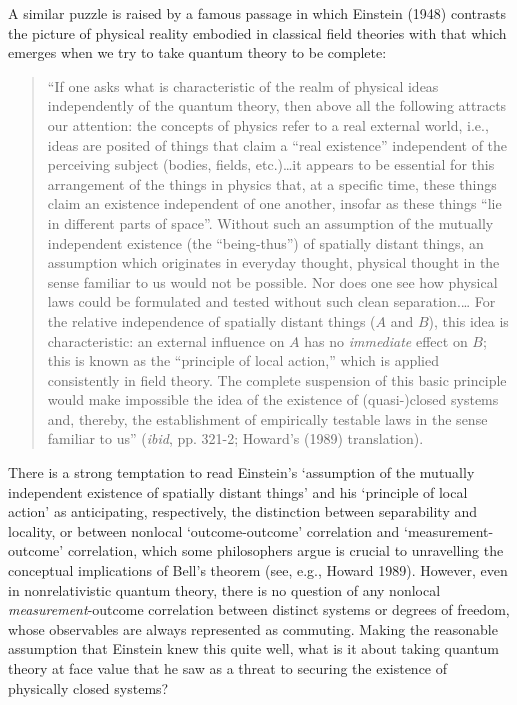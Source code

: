\documentclass[12pt]{article}
\begin{document}
A similar puzzle is raised by a famous passage in which 
Einstein (1948) contrasts the picture of physical reality 
embodied in classical field 
theories with that which emerges when we try to take quantum theory to be 
complete:
\begin{quote}
  ``If one asks what is characteristic of the realm of physical ideas 
  independently of the quantum theory, then above all the following 
  attracts our attention: the concepts of physics refer to a real 
  external world, i.e., ideas are posited of things that claim a 
  ``real existence'' independent of the perceiving subject (bodies, 
  fields, etc.)\ldots it appears to be essential for this arrangement of the 
  things in physics that, at a specific time, these things 
  claim an existence independent of one another, 
 insofar as these things ``lie in different parts of space''.  Without 
 such an assumption of the mutually 
      independent existence (the ``being-thus'') of spatially distant 
      things, an assumption which originates in everyday thought, 
      physical thought in the sense familiar to us would not be 
      possible.  Nor does one see how physical laws could be 
      formulated and tested without such clean separation.\ldots   
      For the relative independence of spatially distant things ($A$ 
      and $B$), this idea is characteristic: an external influence on 
      $A$ has no \emph{immediate} effect on $B$; this is known as the 
      ``principle of local action,'' which is applied consistently in 
      field theory.  The complete suspension of this basic principle 
      would make impossible the idea of the existence of (quasi-)closed systems and, thereby, the establishment of empirically 
      testable laws in the sense familiar to us''  (\emph{ibid}, 
      pp. 321-2; Howard's (1989) translation).
      \end{quote}
      There is a strong temptation to read 
Einstein's `assumption of the mutually independent existence of 
spatially distant things' and his `principle of local action' as 
anticipating, respectively, 
the distinction between separability and locality, or between 
nonlocal `outcome-outcome' correlation and
`measurement-outcome' correlation, which some philosophers argue is 
crucial to unravelling the conceptual implications of Bell's 
theorem (see, e.g., Howard 1989).   However, even in nonrelativistic 
quantum theory, there is no question of any nonlocal 
\emph{measurement}-outcome 
correlation between distinct systems or degrees of freedom, whose observables 
are always represented as commuting.  Making the reasonable assumption that 
Einstein knew this quite well, what 
is it about taking quantum theory at face value that
he saw as a threat to securing the existence of physically 
closed systems?  
\end{document}

